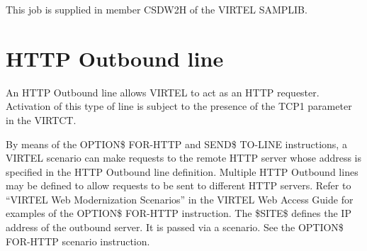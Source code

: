 \documentclass[letterpaper,10pt,english]{sphinxmanual}
\begin{document}
\begin{sphinxVerbatim}[commandchars=\\\{\}]
    
   
    
   
    
\end{sphinxVerbatim}

This job is supplied in member CSDW2H of the VIRTEL SAMPLIB.

\ignorespaces 

\section{HTTP Outbound line}
\label{\detokenize{connectivity_guide:http-outbound-line}}\label{\detokenize{connectivity_guide:v461cn-httpoutbound}}\label{\detokenize{connectivity_guide:index-15}}
An HTTP Outbound line allows VIRTEL to act as an HTTP requester. Activation of this type of line is subject to the presence of the TCP1 parameter in the VIRTCT.

By means of the OPTION\$ FOR-HTTP and SEND\$ TO-LINE instructions, a VIRTEL scenario can make requests to the remote HTTP server whose address is specified in the HTTP Outbound line definition. Multiple HTTP Outbound lines may be defined to allow requests to be sent to different HTTP servers. Refer to “VIRTEL Web Modernization Scenarios” in the VIRTEL Web Access Guide for examples of the OPTION\$ FOR-HTTP instruction. The \$SITE\$ defines the IP address of the outbound server. It is passed via a scenario. See the OPTION\$ FOR-HTTP scenario instruction.


\ignorespaces 
\end{document}
